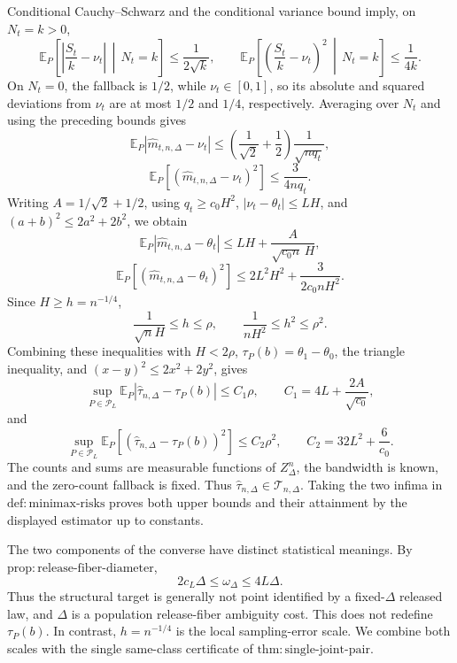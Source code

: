Conditional Cauchy--Schwarz and the conditional variance bound imply, on \(N_t=k>0\),
\[
 \mathbb E_P\!\left[\left|\frac{S_t}{k}-\nu_t\right|\,\middle|\,N_t=k\right]
 \leq\frac1{2\sqrt k},
 \qquad
 \mathbb E_P\!\left[\left(\frac{S_t}{k}-\nu_t\right)^2\,\middle|\,N_t=k\right]
 \leq\frac1{4k}.
\]
On \(N_t=0\), the fallback is \(1/2\), while \(\nu_t\in[0,1]\), so its absolute and squared deviations from \(\nu_t\) are at most \(1/2\) and \(1/4\), respectively.  Averaging over \(N_t\) and using the preceding bounds gives
\[
 \mathbb E_P|\widehat m_{t,n,\Delta}-\nu_t|
 \leq\left(\frac1{\sqrt2}+\frac12\right)\frac1{\sqrt{nq_t}},
\]
\[
 \mathbb E_P[(\widehat m_{t,n,\Delta}-\nu_t)^2]
 \leq\frac3{4nq_t}.
\]
Writing \(A=1/\sqrt2+1/2\), using \(q_t\geq c_0H^2\), \(|\nu_t-\theta_t|\leq LH\), and \((a+b)^2\leq2a^2+2b^2\), we obtain
\[
 \mathbb E_P|\widehat m_{t,n,\Delta}-\theta_t|
 \leq LH+\frac{A}{\sqrt{c_0n}\,H},
\]
\[
 \mathbb E_P[(\widehat m_{t,n,\Delta}-\theta_t)^2]
 \leq2L^2H^2+\frac3{2c_0nH^2}.
\]
Since \(H\geq h=n^{-1/4}\),
\[
 \frac1{\sqrt nH}\leq h\leq\rho,
 \qquad
 \frac1{nH^2}\leq h^2\leq\rho^2.
\]
Combining these inequalities with \(H<2\rho\), \(\tau_P(b)=\theta_1-\theta_0\), the triangle inequality, and \((x-y)^2\leq2x^2+2y^2\), gives
\[
 \sup_{P\in\mathcal P_L}
 \mathbb E_P|\widehat\tau_{n,\Delta}-\tau_P(b)|
 \leq C_1\rho,
 \qquad C_1=4L+\frac{2A}{\sqrt{c_0}},
\]
and
\[
 \sup_{P\in\mathcal P_L}
 \mathbb E_P[(\widehat\tau_{n,\Delta}-\tau_P(b))^2]
 \leq C_2\rho^2,
 \qquad C_2=32L^2+\frac6{c_0}.
\]
The counts and sums are measurable functions of \(Z_\Delta^n\), the bandwidth is known, and the zero-count fallback is fixed.  Thus \(\widehat\tau_{n,\Delta}\in\mathcal T_{n,\Delta}\).  Taking the two infima in \(\mathrm{def:minimax\text{-}risks}\) proves both upper bounds and their attainment by the displayed estimator up to constants.

The two components of the converse have distinct statistical meanings.  By \(\mathrm{prop:release\text{-}fiber\text{-}diameter}\),
\[
 2c_L\Delta\leq\omega_\Delta\leq4L\Delta.
\]
Thus the structural target is generally not point identified by a fixed-\(\Delta\) released law, and \(\Delta\) is a population release-fiber ambiguity cost.  This does not redefine \(\tau_P(b)\).  In contrast, \(h=n^{-1/4}\) is the local sampling-error scale.  We combine both scales with the single same-class certificate of \(\mathrm{thm:single\text{-}joint\text{-}pair}\).

